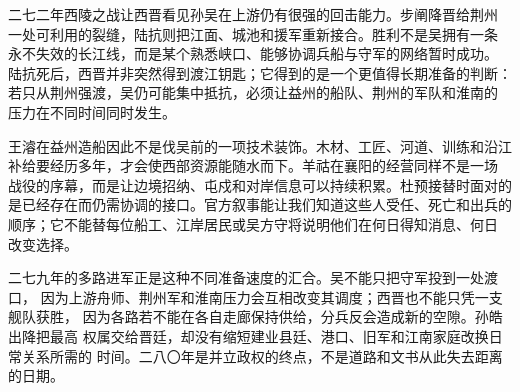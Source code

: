 二七二年西陵之战让西晋看见孙吴在上游仍有很强的回击能力。步阐降晋给荆州
一处可利用的裂缝，陆抗则把江面、城池和援军重新接合。胜利不是吴拥有一条
永不失效的长江线，而是某个熟悉峡口、能够协调兵船与守军的网络暂时成功。
陆抗死后，西晋并非突然得到渡江钥匙；它得到的是一个更值得长期准备的判断：
若只从荆州强渡，吴仍可能集中抵抗，必须让益州的船队、荆州的军队和淮南的
压力在不同时间同时发生。

王濬在益州造船因此不是伐吴前的一项技术装饰。木材、工匠、河道、训练和沿江
补给要经历多年，才会使西部资源能随水而下。羊祜在襄阳的经营同样不是一场
战役的序幕，而是让边境招纳、屯戍和对岸信息可以持续积累。杜预接替时面对的
是已经存在而仍需协调的接口。官方叙事能让我们知道这些人受任、死亡和出兵的
顺序；它不能替每位船工、江岸居民或吴方守将说明他们在何日得知消息、何日
改变选择。

二七九年的多路进军正是这种不同准备速度的汇合。吴不能只把守军投到一处渡口，
因为上游舟师、荆州军和淮南压力会互相改变其调度；西晋也不能只凭一支舰队获胜，
因为各路若不能在各自走廊保持供给，分兵反会造成新的空隙。孙皓出降把最高
权属交给晋廷，却没有缩短建业县廷、港口、旧军和江南家庭改换日常关系所需的
时间。二八〇年是并立政权的终点，不是道路和文书从此失去距离的日期。
